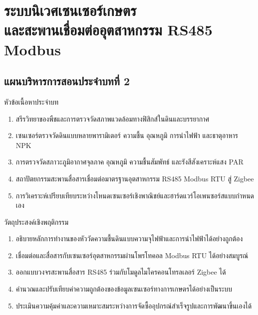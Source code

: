 \chapter[ระบบนิเวศเซนเซอร์เกษตรและสะพานเชื่อมต่ออุตสาหกรรม RS485 Modbus]{ระบบนิเวศเซนเซอร์เกษตร\\และสะพานเชื่อมต่ออุตสาหกรรม RS485 Modbus}
\label{chap:ch02}

\section*{แผนบริหารการสอนประจำบทที่ 2}

\begin{planbox}{หัวข้อเนื้อหาประจำบท}
\begin{enumerate}[topsep=1pt, itemsep=0.5pt, partopsep=0pt, parsep=0pt, leftmargin=1.5em]
    \item สรีรวิทยาของพืชและการตรวจวัดสภาพแวดล้อมทางฟิสิกส์ในดินและบรรยากาศ
    \item เซนเซอร์ตรวจวัดดินแบบหลายพารามิเตอร์ ความชื้น อุณหภูมิ การนำไฟฟ้า และธาตุอาหาร NPK
    \item การตรวจวัดสภาวะภูมิอากาศจุลภาค อุณหภูมิ ความชื้นสัมพัทธ์ และรังสีสังเคราะห์แสง PAR
    \item สถาปัตยกรรมสะพานสื่อสารเชื่อมต่อมาตรฐานอุตสาหกรรม RS485 Modbus RTU สู่ Zigbee
    \item การวิเคราะห์เปรียบเทียบระหว่างโหนดเซนเซอร์เชิงพาณิชย์และฮาร์ดแวร์โอเพนซอร์สแบบกำหนดเอง
\end{enumerate}
\end{planbox}

\begin{planbox}{วัตถุประสงค์เชิงพฤติกรรม}
\begin{enumerate}[topsep=1pt, itemsep=0.5pt, partopsep=0pt, parsep=0pt, leftmargin=1.5em]
    \item อธิบายหลักการทำงานของหัววัดความชื้นดินแบบความจุไฟฟ้าและการนำไฟฟ้าได้อย่างถูกต้อง
    \item เชื่อมต่อและสื่อสารกับเซนเซอร์อุตสาหกรรมผ่านโพรโทคอล Modbus RTU ได้อย่างสมบูรณ์
    \item ออกแบบวงจรสะพานสื่อสาร RS485 ร่วมกับโมดูลไมโครคอนโทรลเลอร์ Zigbee ได้
    \item คำนวณและปรับเทียบค่าความถูกต้องของข้อมูลเซนเซอร์ทางการเกษตรได้อย่างเป็นระบบ
    \item ประเมินความคุ้มค่าและความเหมาะสมระหว่างการจัดซื้ออุปกรณ์สำเร็จรูปและการพัฒนาขึ้นเองได้
\end{enumerate}
\end{planbox}

